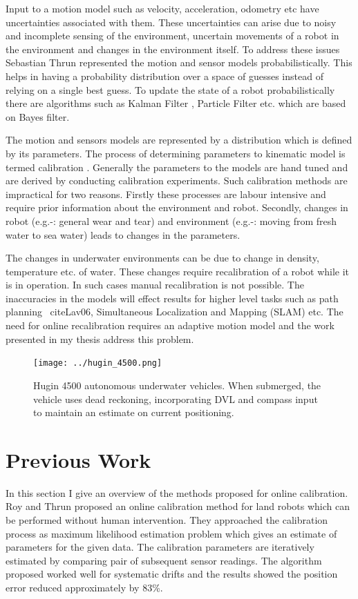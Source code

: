 \documentclass[12pt]{dalcsthesis}
\begin{document}
Input to a motion model such as velocity, acceleration, odometry etc have uncertainties associated with them. These uncertainties can arise due to noisy and incomplete sensing of the environment, uncertain movements of a robot in the environment and changes in the environment itself. To address these issues Sebastian Thrun \cite{thrun2005probabilistic} represented the motion and sensor models probabilistically. This helps in having a probability distribution over a space of guesses instead of relying on a single best guess. To update the state of a robot probabilistically there are algorithms such as Kalman Filter \cite{kalman1960new}, Particle Filter \cite{gordon1993novel} etc. which are based on Bayes filter. 

The motion and sensors models are represented by a distribution which is defined by its parameters.  The process of determining parameters to kinematic model is termed calibration \cite{cox1990autonomous}  \cite{vukobratovic1989introduction}. Generally the parameters to the models are hand tuned and are derived by conducting calibration experiments. Such calibration methods are impractical for two reasons. Firstly these processes are labour intensive and require prior information about the environment and robot. Secondly, changes in robot (e.g.-:  general wear and tear) and environment (e.g.-: moving from fresh water to sea water) leads to changes in the parameters.

The changes in underwater environments can be due to change in density, temperature etc. of water. These changes require recalibration of a robot while it is in operation. In such cases manual recalibration is not possible. The inaccuracies in the models will effect results for higher level tasks such as path planning \
cite{Lav06}, Simultaneous Localization and Mapping (SLAM) \cite{thrun2005probabilistic} \cite{grisettiyz2005improving} etc. The need for online recalibration requires an adaptive motion model and the work presented in my thesis address this problem.


\begin{figure}
  \centering
     {\texttt{[image: ../hugin\_4500.png]}}
  \caption{\label{fig-Hugin 4500} Hugin 4500 autonomous underwater vehicles. When submerged, the vehicle uses dead reckoning, incorporating DVL and compass input to maintain an estimate on current positioning.
}
\end{figure}




\section{Previous Work}
In this section I give an overview of the methods proposed for online calibration. Roy and Thrun \cite{Roy} proposed an online calibration method for land robots which can be performed without human intervention.  They approached the calibration process as maximum likelihood estimation problem which gives an estimate of parameters for the given data. The calibration parameters are iteratively estimated by comparing pair of subsequent sensor readings. The algorithm proposed worked well for systematic drifts and the results showed the position error reduced approximately by 83\%.
\end{document}
